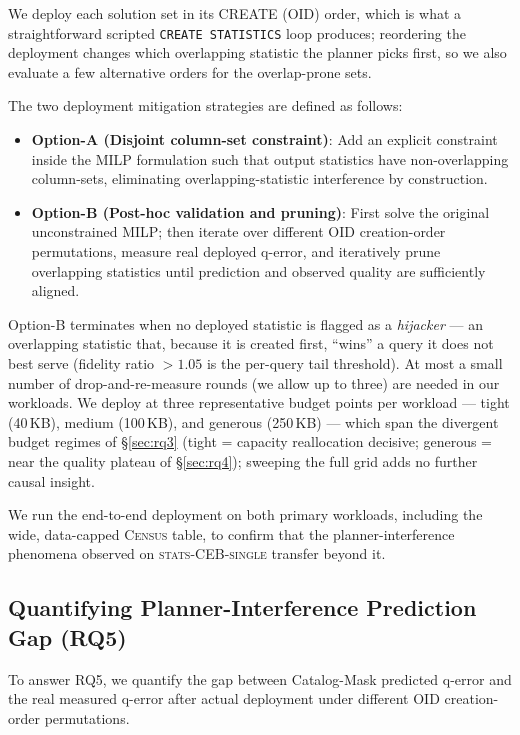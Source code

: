 \documentclass[sigconf, nonacm]{acmart}
\begin{document}
We deploy each solution set in its CREATE (OID) order, which is what a straightforward scripted \texttt{CREATE STATISTICS} loop produces; reordering the deployment changes which overlapping statistic the planner picks first, so we also evaluate a few alternative orders for the overlap-prone sets.

The two deployment mitigation strategies are defined as follows:
\begin{itemize}
    \item \textbf{Option-A (Disjoint column-set constraint)}: Add an explicit constraint inside the MILP formulation such that output statistics have non-overlapping column-sets, eliminating overlapping-statistic interference by construction.
    \item \textbf{Option-B (Post-hoc validation and pruning)}: First solve the original unconstrained MILP; then iterate over different OID creation-order permutations, measure real deployed q-error, and iteratively prune overlapping statistics until prediction and observed quality are sufficiently aligned.
\end{itemize}

Option-B terminates when no deployed statistic is flagged as a \emph{hijacker} --- an overlapping statistic that, because it is created first, ``wins'' a query it does not best serve (fidelity ratio $>1.05$ is the per-query tail threshold).
At most a small number of drop-and-re-measure rounds (we allow up to three) are needed in our workloads. We deploy at three representative budget points per workload --- tight (40\,KB), medium (100\,KB), and generous (250\,KB) --- which span the divergent budget regimes of \S\ref{sec:rq3} (tight = capacity reallocation decisive; generous = near the quality plateau of \S\ref{sec:rq4}); sweeping the full grid adds no further causal insight.

We run the end-to-end deployment on both primary workloads, including the wide, data-capped \textsc{Census} table, to confirm that the planner-interference phenomena observed on \textsc{stats-CEB-single} transfer beyond it. 

\subsection{Quantifying Planner-Interference Prediction Gap (RQ5)}
\label{sec:rq5_interference_gap}

To answer RQ5, we quantify the gap between Catalog-Mask predicted q-error and the real measured q-error after actual deployment under different OID creation-order permutations.
\end{document}
